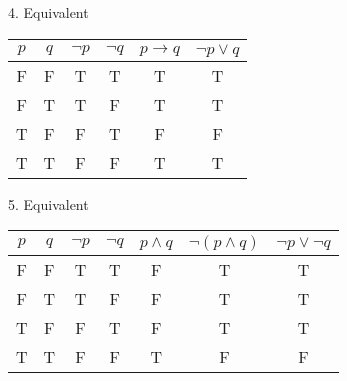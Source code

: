 \documentclass[11pt]{article}
\begin{document}
4. Equivalent
\begin{center}
\begin{tabular}{|c|c|c|c|c|c|}
\hline
$p$ & $q$ & $\lnot p$ & $\lnot q$ & $p \rightarrow q$ & $\lnot p \lor q$\\
\hline
F & F & T & T & T & T\\
F & T & T & F & T & T\\
T & F & F & T & F & F\\
T & T & F & F & T & T\\
\hline
\end{tabular}
\end{center}

5. Equivalent
\begin{center}
\begin{tabular}{|c|c|c|c|c|c|c|}
\hline
$p$ & $q$ & $\lnot p$ & $\lnot q$ & $p \land q$ &$\lnot(p \land q)$ & $\lnot p \lor \lnot q$\\
\hline
F & F & T & T & F & T & T\\
F & T & T & F & F & T & T\\
T & F & F & T & F & T & T\\
T & T & F & F & T & F & F\\
\hline
\end{tabular}
\end{center}
\end{document}
